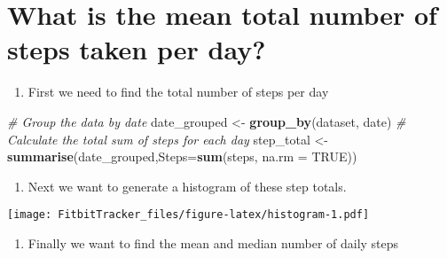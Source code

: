 \documentclass[]{article}
\newenvironment{Shaded}{\begin{snugshade}}{\end{snugshade}}
\newcommand{\KeywordTok}[1]{\textcolor[rgb]{0.13,0.29,0.53}{\textbf{{#1}}}}
\newcommand{\DataTypeTok}[1]{\textcolor[rgb]{0.13,0.29,0.53}{{#1}}}
\newcommand{\DecValTok}[1]{\textcolor[rgb]{0.00,0.00,0.81}{{#1}}}
\newcommand{\StringTok}[1]{\textcolor[rgb]{0.31,0.60,0.02}{{#1}}}
\newcommand{\CommentTok}[1]{\textcolor[rgb]{0.56,0.35,0.01}{\textit{{#1}}}}
\newcommand{\OtherTok}[1]{\textcolor[rgb]{0.56,0.35,0.01}{{#1}}}
\newcommand{\NormalTok}[1]{{#1}}
\providecommand{\tightlist}{%
  \setlength{\itemsep}{0pt}\setlength{\parskip}{0pt}}
\begin{document}
\section{What is the mean total number of steps taken per
day?}\label{what-is-the-mean-total-number-of-steps-taken-per-day}

\begin{enumerate}
\def\labelenumi{\arabic{enumi}.}
\tightlist
\item
  First we need to find the total number of steps per day
\end{enumerate}

\begin{Shaded}
\begin{Highlighting}[]
\CommentTok{# Group the data by date}
\NormalTok{date_grouped <-}\StringTok{ }\KeywordTok{group_by}\NormalTok{(dataset, date)}
\CommentTok{# Calculate the total sum of steps for each day}
\NormalTok{step_total <-}\StringTok{ }\KeywordTok{summarise}\NormalTok{(date_grouped,}\DataTypeTok{Steps=}\KeywordTok{sum}\NormalTok{(steps, }\DataTypeTok{na.rm =} \OtherTok{TRUE}\NormalTok{))}
\end{Highlighting}
\end{Shaded}

\begin{enumerate}
\def\labelenumi{\arabic{enumi}.}
\setcounter{enumi}{1}
\tightlist
\item
  Next we want to generate a histogram of these step totals.
\end{enumerate}

\begin{Shaded}
\end{Shaded}

\texttt{[image: FitbitTracker\_files/figure-latex/histogram-1.pdf]}

\begin{enumerate}
\def\labelenumi{\arabic{enumi}.}
\setcounter{enumi}{2}
\tightlist
\item
  Finally we want to find the mean and median number of daily steps
\end{enumerate}
\end{document}
